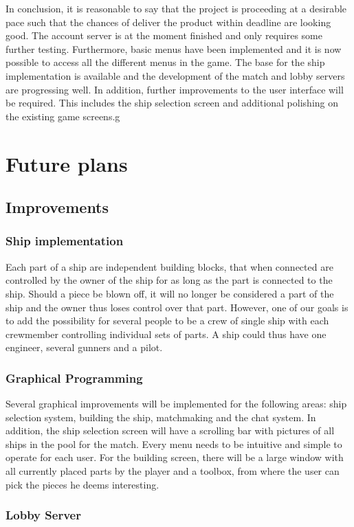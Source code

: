 \documentclass[11pt]{report}
\begin{document}
In conclusion, it is reasonable to say that the project is proceeding at a desirable pace such that the chances of deliver the product within deadline are looking good. The account server is at the moment finished and only requires some further testing. Furthermore, basic menus have been implemented and it is now possible to access all the different menus in the game. The base for the ship implementation is available and the development of the match and lobby servers are progressing well. In addition, further improvements to the user interface will be required. This includes the ship selection screen and additional  polishing on the existing game screens.g
\section{Future plans}
\subsection{Improvements}
\subsubsection{Ship implementation}

Each part of a ship are independent building blocks, that when connected are controlled by the owner of the ship for as long as the part is connected to the ship. Should a piece be blown off, it will no longer be considered a part of the ship and the owner thus loses control over that part. However, one of our goals is to add the possibility for several people to be a crew of single ship with each crewmember controlling individual sets of parts. A ship could thus have one engineer, several gunners and a pilot.
\subsubsection{Graphical Programming}

Several graphical improvements will be implemented for the following areas:  ship selection system, building the ship, matchmaking and the chat system. In addition, the ship selection screen will have a scrolling bar with pictures of all ships in the pool for the match. Every menu needs to be intuitive and simple to operate for each user. For the building screen, there will be a large window with all currently placed parts by the player and a toolbox, from where the user can pick the pieces he deems interesting.
\subsubsection{Lobby Server}
\end{document}
